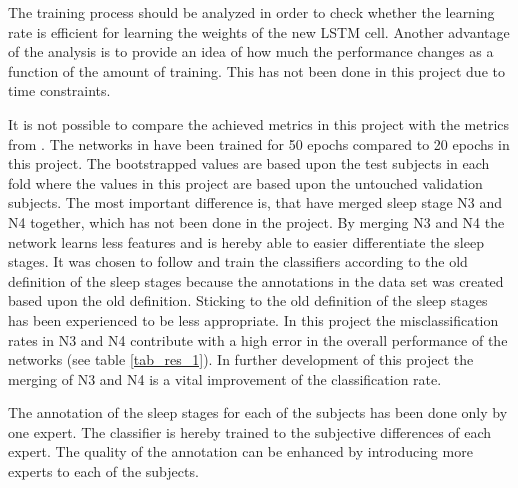 The training process should be analyzed in order to check whether the learning rate is efficient for learning the weights of the new LSTM cell.
Another advantage of the analysis is to provide an idea of how much the performance changes as a function of the amount of training. This has not been done in this project due to time constraints.

It is not possible to compare the achieved metrics in this project with the metrics from \cite{main_ar}. 
The networks in \cite{main_ar} have been trained for 50 epochs compared to 20 epochs in this project. The bootstrapped values are based upon the test subjects in each fold where the values in this project are based upon the untouched validation subjects. 
The most important difference is, that \cite{main_ar} have merged sleep stage N3 and N4 together, which has not been done in the project. By merging N3 and N4 the network learns less features and is hereby able to easier differentiate the sleep stages. 
It was chosen to follow and train the classifiers according to the old definition of the sleep stages because the annotations in the data set was created based upon the old definition. Sticking to the old definition of the sleep stages has been experienced to be less appropriate.
In this project the misclassification rates in N3 and N4 contribute with a high error in the overall performance of the networks (see table \ref{tab_res_1}).
In further development of this project the merging of N3 and N4 is a vital improvement of the classification rate.

The annotation of the sleep stages for each of the subjects has been done only by one expert. The classifier is hereby trained to the subjective differences of each expert. The quality of the annotation can be enhanced by introducing more experts to each of the subjects.

